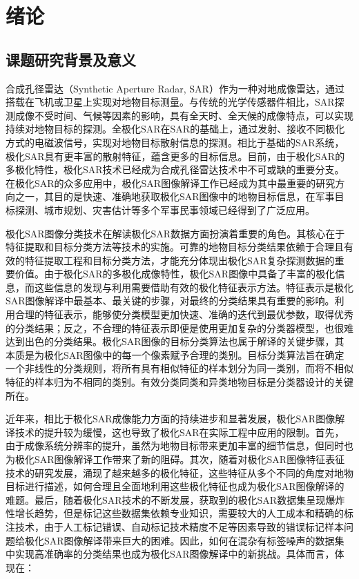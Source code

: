 \chapter{绪\hspace{6pt}论}

\section{课题研究背景及意义}
合成孔径雷达（Synthetic Aperture Radar, SAR）作为一种对地成像雷达，通过搭载在飞机或卫星上实现对地物目标测量。与传统的光学传感器件相比，SAR探测成像不受时间、气候等因素的影响，具有全天时、全天候的成像特点，可以实现持续对地物目标的探测。全极化SAR在SAR的基础上，通过发射、接收不同极化方式的电磁波信号，实现对地物目标散射信息的探测。相比于基础的SAR系统，极化SAR具有更丰富的散射特征，蕴含更多的目标信息。目前，由于极化SAR的多极化特性，极化SAR技术已经成为合成孔径雷达技术中不可或缺的重要分支。在极化SAR的众多应用中，极化SAR图像解译工作已经成为其中最重要的研究方向之一，其目的是快速、准确地获取极化SAR图像中的地物目标信息，在军事目标探测、城市规划、灾害估计等多个军事民事领域已经得到了广泛应用。

极化SAR图像分类技术在解读极化SAR数据方面扮演着重要的角色。其核心在于特征提取和目标分类方法等技术的实施。可靠的地物目标分类结果依赖于合理且有效的特征提取工程和目标分类方法，才能充分体现出极化SAR复杂探测数据的重要价值。由于极化SAR的多极化成像特性，极化SAR图像中具备了丰富的极化信息，而这些信息的发现与利用需要借助有效的极化特征表示方法。特征表示是极化SAR图像解译中最基本、最关键的步骤，对最终的分类结果具有重要的影响。利用合理的特征表示，能够使分类模型更加快速、准确的迭代到最优参数，取得优秀的分类结果；反之，不合理的特征表示即便是使用更加复杂的分类器模型，也很难达到出色的分类结果。极化SAR图像的目标分类算法也属于解译的关键步骤，其本质是为极化SAR图像中的每一个像素赋予合理的类别。目标分类算法旨在确定一个非线性的分类规则，将所有具有相似特征的样本划分为同一类别，而将不相似特征的样本归为不相同的类别。有效分类同类和异类地物目标是分类器设计的关键所在。

近年来，相比于极化SAR成像能力方面的持续进步和显著发展，极化SAR图像解译技术的提升较为缓慢，这也导致了极化SAR在实际工程中应用的限制。首先，由于成像系统分辨率的提升，虽然为地物目标带来更加丰富的细节信息，但同时也为极化SAR图像解译工作带来了新的阻碍。其次，随着对极化SAR图像特征表征技术的研究发展，涌现了越来越多的极化特征，这些特征从多个不同的角度对地物目标进行描述，如何合理且全面地利用这些极化特征也成为极化SAR图像解译的难题。最后，随着极化SAR技术的不断发展，获取到的极化SAR数据集呈现爆炸性增长趋势，但是标记这些数据集依赖专业知识，需要较大的人工成本和精确的标注技术，由于人工标记错误、自动标记技术精度不足等因素导致的错误标记样本问题给极化SAR图像解译带来巨大的困难。因此，如何在混杂有标签噪声的数据集中实现高准确率的分类结果也成为极化SAR图像解译中的新挑战。具体而言，体现在：

